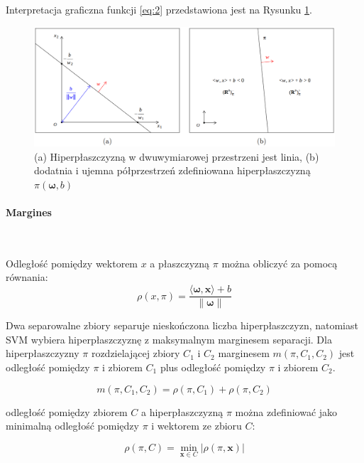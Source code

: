 \documentclass[paper=a4, fontsize=11pt]{scrartcl} %
\newcommand{\myparagraph}[1]{\paragraph{#1}\mbox{}\\}
\numberwithin{equation}{section} %
\numberwithin{figure}{section} %
\newcommand{\norm}[1]{\left\lVert#1\right\rVert}
\begin{document}
    Interpretacja graficzna funkcji \ref{eq:2} przedstawiona jest na Rysunku \ref{fig:hiperplane_expl}.

    \begin{figure}[H]
        \begin{center}
            \includegraphics[scale=0.4]{./img/hyperplane_expl.png}
            \caption{(a) Hiperpłaszczyzną w dwuwymiarowej przestrzeni jest linia, (b) dodatnia
            i ujemna półprzestrzeń zdefiniowana hiperpłaszczyzną $\pi(\pmb{\omega},b)$ \cite{nefedov2016support}}
            \label{fig:hiperplane_expl}
        \end{center}
    \end{figure}

\myparagraph{Margines}
    \par Odległość pomiędzy wektorem $x$ a płaszczyzną $\pi$ można obliczyć za pomocą równania:
    \begin{equation}
        \rho(x,\pi) = \frac{\langle \pmb{\omega}, \pmb{x} \rangle + b}{\norm{\pmb{\omega}}}
    \end{equation}

    \par Dwa separowalne zbiory separuje nieskończona liczba
    hiperpłaszczyzn, natomiast SVM wybiera hiperpłaszczyznę z maksymalnym marginesem separacji. Dla hiperpłaszczyzny $\pi$
    rozdzielającej zbiory $C_1$ i $C_2$ marginesem $m(\pi, C_1, C_2)$ jest odległość pomiędzy
    $\pi$ i zbiorem $C_1$ plus odległość pomiędzy $\pi$ i zbiorem $C_2$.

    \begin{equation}
        m(\pi, C_1, C_2) = \rho(\pi, C_1) + \rho(\pi, C_2)
    \end{equation}

    odległość pomiędzy zbiorem $C$ a hiperpłaszczyzną $\pi$ można zdefiniować jako minimalną odległość
    pomiędzy $\pi$ i wektorem ze zbioru $C$:

    \begin{equation}
        \rho(\pi, C) = \min\limits_{\pmb{x} \in C} \lvert \rho(\pi, \pmb{x}) \rvert
    \end{equation}
\end{document}
